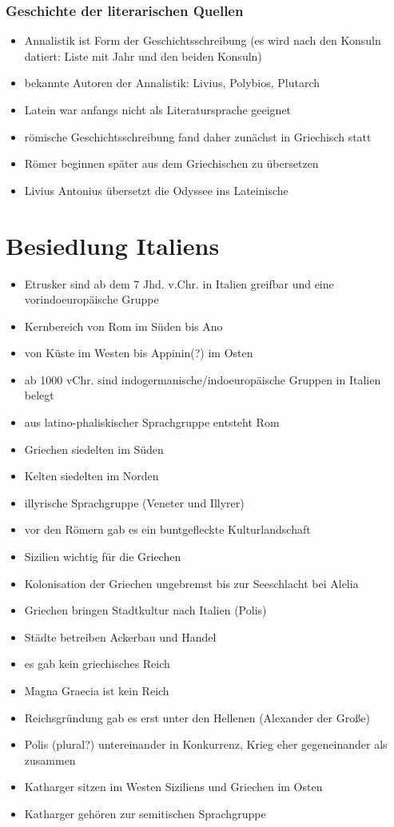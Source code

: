 \documentclass[10pt,a4paper,oneside,ngerman,numbers=noenddot]{scrartcl}
\newenvironment{myitemize}{\begin{itemize}\itemsep -9pt}{\end{itemize}} %
\begin{document}
\subsubsection*{Geschichte der literarischen Quellen}
\begin{myitemize}
    \item Annalistik ist Form der Geschichtsschreibung (es wird nach den Konsuln datiert: Liste mit Jahr und den beiden Konsuln)
    \item bekannte Autoren der Annalistik: Livius, Polybios, Plutarch
    \item Latein war anfangs nicht als Literatursprache geeignet
    \item römische Geschichtsschreibung fand daher zunächst in Griechisch statt
    \item Römer beginnen später aus dem Griechischen zu übersetzen
    \item Livius Antonius übersetzt die Odyssee ins Lateinische 
\end{myitemize}

\section*{Besiedlung Italiens}

\begin{myitemize}
    \item Etrusker sind ab dem 7 Jhd. v.Chr. in Italien greifbar und eine vorindoeuropäische Gruppe
    \item Kernbereich von Rom im Süden bis Ano
    \item von Küste im Westen bis Appinin(?) im Osten
    \item ab 1000 vChr. sind indogermanische/indoeuropäische Gruppen in Italien belegt
    \item aus latino-phaliskischer Sprachgruppe entsteht Rom
    \item Griechen siedelten im Süden
    \item Kelten siedelten im Norden
    \item illyrische Sprachgruppe (Veneter und Illyrer)
    \item vor den Römern gab es ein buntgefleckte Kulturlandschaft
    \item Sizilien wichtig für die Griechen
    \item Kolonisation der Griechen ungebremst bis zur Seeschlacht bei Alelia
    \item Griechen bringen Stadtkultur nach Italien (Polis)
    \item Städte betreiben Ackerbau und Handel
    \item es gab kein griechisches Reich
    \item Magna Graecia ist kein Reich
    \item Reichsgründung gab es erst unter den Hellenen (Alexander der Große)
    \item Polis (plural?) untereinander in Konkurrenz, Krieg eher gegeneinander als zusammen
    \item Katharger sitzen im Westen Siziliens und Griechen im Osten
    \item Katharger gehören zur semitischen Sprachgruppe
\end{myitemize}
\end{document}
